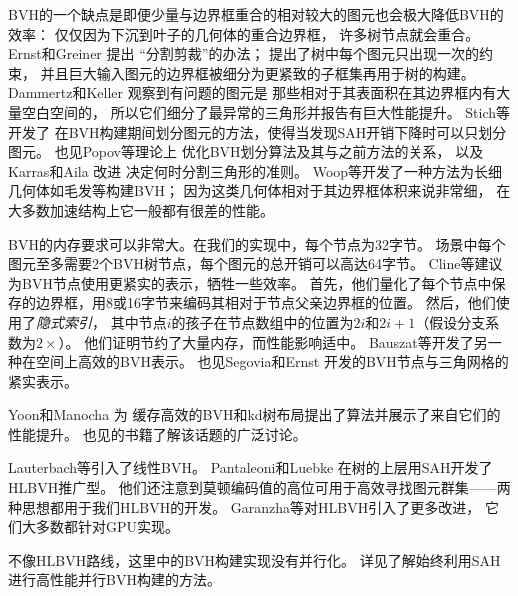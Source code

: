 BVH的一个缺点是即便少量与边界框重合的相对较大的图元也会极大降低BVH的效率：
仅仅因为下沉到叶子的几何体的重合边界框，
许多树节点就会重合。Ernst和Greiner \parencite*{4342593}提出
“分割剪裁”的办法；
提出了树中每个图元只出现一次的约束，
并且巨大输入图元的边界框被细分为更紧致的子框集再用于树的构建。
Dammertz和Keller \parencite*{4634636}观察到有问题的图元是
那些相对于其表面积在其边界框内有大量空白空间的，
所以它们细分了最异常的三角形并报告有巨大性能提升。
Stich等\parencite*{10.1145/1572769.1572771}开发了
在BVH构建期间划分图元的方法，使得当发现SAH开销下降时可以只划分图元。
也见Popov等\parencite*{10.1145/1572769.1572772}理论上
优化BVH划分算法及其与之前方法的关系，
以及Karras和Aila \parencite*{10.1145/2492045.2492055}改进
决定何时分割三角形的准则。
Woop等\parencite*{10.5555/2980009.2980014}开发了一种方法为长细几何体如毛发等构建BVH；
因为这类几何体相对于其边界框体积来说非常细，
在大多数加速结构上它一般都有很差的性能。

BVH的内存要求可以非常大。在我们的实现中，每个节点为32字节。
场景中每个图元至多需要2个BVH树节点，每个图元的总开销可以高达64字节。
Cline等\parencite*{10.5555/2383894.2383909}建议为BVH节点使用更紧实的表示，牺牲一些效率。
首先，他们量化了每个节点中保存的边界框，用8或16字节来编码其相对于节点父亲边界框的位置。
然后，他们使用了{\itshape 隐式索引}，
其中节点$i$的孩子在节点数组中的位置为$2i$和$2i+1$（假设分支系数为$2\times$）。
他们证明节约了大量内存，而性能影响适中。
Bauszat等\parencite*{10.2312:PE:VMV:VMV10:227-234}开发了另一种在空间上高效的BVH表示。
也见Segovia和Ernst \parencite*{10.5555/1839214.1839242}开发的BVH节点与三角网格的紧实表示。

Yoon和Manocha \parencite*{10.1111/j.1467-8659.2006.00970.x}为
缓存高效的BVH和kd树布局提出了算法并展示了来自它们的性能提升。
也见\citet{10.5555/1121584}的书籍了解该话题的广泛讨论。

Lauterbach等\parencite*{10.1111/j.1467-8659.2009.01377.x}引入了线性BVH。
Pantaleoni和Luebke \parencite*{10.5555/1921479.1921493}在树的上层用SAH开发了HLBVH推广型。
他们还注意到莫顿编码值的高位可用于高效寻找图元群集——两种思想都用于我们HLBVH的开发。
Garanzha等\parencite*{10.1145/2018323.2018333}对HLBVH引入了更多改进，
它们大多数都针对GPU实现。

不像HLBVH路线，这里中的BVH构建实现没有并行化。
详见\citet{5669303}了解始终利用SAH进行高性能并行BVH构建的方法。

